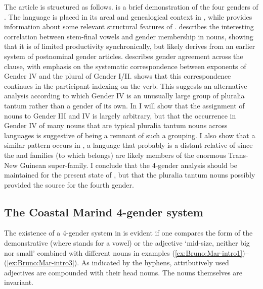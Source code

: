 \documentclass[output=collectionpaper]{langsci/langscibook}
\begin{document}
The article is structured as follows.  is a brief demonstration of the four genders of . The language is placed in its areal and genealogical context in , while  provides information about some relevant structural features of .
%
 describes the interesting correlation between stem-final vowels and gender membership in nouns, showing that it is of limited productivity synchronically, but likely derives from an earlier system of postnominal gender articles.
%
 describes gender agreement across the clause, with emphasis on the systematic correspondence between exponents of Gender IV and the plural of Gender I/II.
%
 shows that this correspondence continues in the participant indexing on the verb. This suggests an alternative analysis according to which Gender IV is an unusually large group of pluralia tantum rather than a gender of its own.
%
In  I will show that the assignment of nouns to Gender III and IV is largely arbitrary, but that the occurrence in Gender IV of many nouns that are typical pluralia tantum nouns across languages is suggestive of being a remnant of such a grouping. I also show that a similar pattern occurs in , a language that probably is a distant relative of  since the  and  families (to which  belongs) are likely members of the enormous Trans-New Guinean super-family. I conclude that the 4-gender analysis should be maintained for the present state of , but that the pluralia tantum nouns possibly provided the source for the fourth gender.

\subsection{The Coastal Marind 4-gender system}\label{sec:Bruno:MarGndr}
The existence of a 4-gender system in  is evident if one compares the form of the demonstrative  (where  stands for a vowel) or the adjective  `mid-size, neither big nor small' combined with different nouns in examples (\ref{ex:Bruno:Mar-intro1})--(\ref{ex:Bruno:Mar-intro3}). As indicated by the hyphens, attributively used adjectives are compounded with their head nouns. The nouns themselves are invariant.
\end{document}

